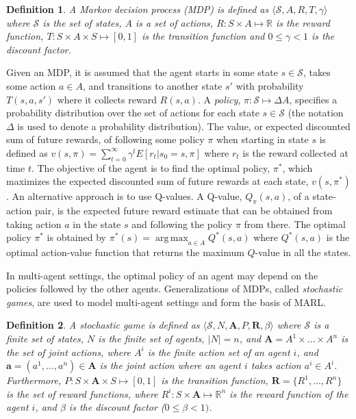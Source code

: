 \documentclass[jair, twoside,11pt,theapa]{article}
\DeclareMathOperator*{\argmax}{arg\,max}
\newtheorem{defn}{Definition}
\begin{document}
\begin{defn}
A Markov decision process (MDP) is defined as $\langle \mathcal{S},A,R,T, \gamma \rangle$ where $\mathcal{S}$ is the set of states, $A$ is a set of actions, $R:S\times A\mapsto \mathbb{R}$ is the reward function, $T:S\times A \times S\mapsto [0,1]$ is the transition function and  $0\leq\gamma<1$ is the discount factor.
\end{defn}
Given an MDP, it is assumed that the agent starts in some state $s \in \mathcal{S}$, takes some action $a\in A$, and transitions to another state $s'$ with probability $T(s,a,s')$ where it collects reward $R(s,a)$.
A \emph{policy}, $\pi:\mathcal{S}\mapsto \Delta A$, specifies a probability distribution over the set of actions for each state $s\in\mathcal{S}$ (the notation $\Delta$ is used to denote a probability distribution). The value, or expected discounted sum of future rewards, of following some policy $\pi$ when starting in state $s$ is defined as $v(s,\pi)=\sum_{t=0}^\infty \gamma^t E[r_t|s_0=s, \pi]$ where $r_t$ is the reward collected at time $t$. 
The objective  of the agent is to find the optimal policy, $\pi^*$, which maximizes the expected discounted sum of future rewards at each state, $v(s, \pi^*)$. An alternative approach is to use Q-values. A  Q-value, $Q_{\pi}(s,a)$, of a state-action pair, is the expected future reward estimate that can be obtained from taking action $a$ in the state $s$ and following the policy $\pi$ from there. The optimal policy $\pi^{*}$ is obtained by $\pi^{*}(s) = \argmax_{a \in A} Q^*(s,a)$ where $ Q^*(s,a)$ is the optimal action-value function that returns the maximum $Q$-value in all the states. 


In multi-agent settings, the optimal policy of an agent may depend on the policies followed by the other agents.  Generalizations of MDPs, called \emph{stochastic games}, are used to model multi-agent settings and form the basis of MARL. 

\begin{defn}
A stochastic game is defined as $\langle \mathcal{S},N,\mathbf{A},P,\mathbf{R}, \beta \rangle $ where
$\mathcal{S}$ is a finite set of states, $N$ is the finite set of agents, $|N|=n$, and $\mathbf{A}=A^1\times\ldots \times A^n$ is the set of joint actions, where $A^i$ is the finite action set of an agent $i$, and  $\boldsymbol{a}=(a^1,\ldots,a^n)\in \mathbf{A}$ is the joint action where an agent $i$ takes action $a^i\in A^i$. Furthermore, $P:S\times\mathbf{A}\times S\mapsto [0,1]$ is the transition function, $\boldsymbol{R} = \{R^1, \ldots, R^n\}$ is the set of reward functions, where  $R^i:S\times\mathbf{A}\mapsto\mathbb{R}^n$ is the reward function of the agent $i$, and $\beta$ is the discount factor ($0\leq\beta<1)$.
\end{defn}
\end{document}
